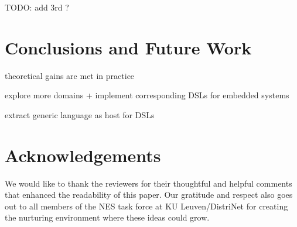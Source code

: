 \documentclass[conference]{IEEEtran}
\begin{document}
TODO: add 3rd ? \cite{krontiris2009cooperative}

\section{Conclusions and Future Work}

theoretical gains are met in practice

explore more domains + implement corresponding DSLs for embedded systems

extract generic language as host for DSLs

\section*{Acknowledgements}

We would like to thank the reviewers for their thoughtful and helpful comments
that enhanced the readability of this paper. Our gratitude and respect also
goes out to all members of the NES task force at KU Leuven/DistriNet for
creating the nurturing environment where these ideas could grow.



\end{document}
